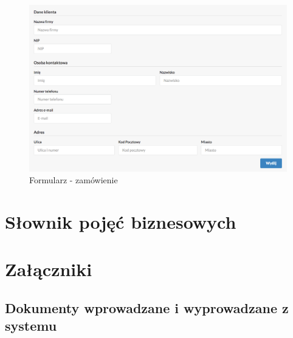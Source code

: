 \documentclass[paper=a4, fontsize=12pt]{scrartcl}
\numberwithin{equation}{section}		%
\numberwithin{figure}{section}			%
\numberwithin{table}{section}				%
\begin{document}
	\begin{figure}[H]
		\centering
		\centerline{\includegraphics[width=1.2\textwidth]{partials/2-wymagania/dokumenty/oferta-firma.png}}
		\caption{Formularz - zamówienie}
	\end{figure}






\section{Słownik pojęć biznesowych}
	

\section{Załączniki}
	\subsection{Dokumenty wprowadzane i wyprowadzane z systemu}
			
				
		
\end{document}
